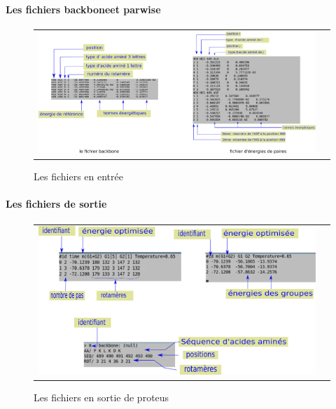 \paragraph{Les fichiers \og backbone\fg et \og parwise\fg}


   \begin{figure}[t]
     \centering
     \begin{tabular}{cc}
       \includegraphics[width=12cm]{graphe/proteus/inputener.png} &
     \end{tabular}
     
     \caption{Les fichiers en entrée}
\label{graph:struct_Phy}
   \end{figure}



\paragraph{Les fichiers de sortie}
   
   \begin{figure}[t]
     \centering
     \begin{tabular}{cc}
       \includegraphics[width=12cm]{graphe/proteus/output.png} &
     \end{tabular}
     
     \caption{Les fichiers en sortie de proteus}
\label{graph:struct_Phy}
   \end{figure}
   

